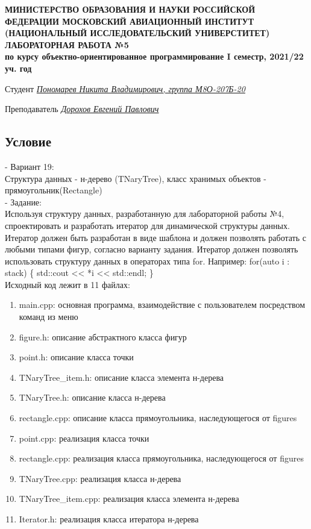 \documentclass[12pt]{article}
\begin{document}
\begin{titlepage}
\begin{center}
\textbf{МИНИСТЕРСТВО ОБРАЗОВАНИЯ И НАУКИ РОССИЙСКОЙ ФЕДЕРАЦИИ
\medskip
МОСКОВСКИЙ АВИАЦИОННЫЙ ИНСТИТУТ
(НАЦИОНАЛЬНЫЙ ИССЛЕДОВАТЕЛЬСКИЙ УНИВЕРСТИТЕТ)
\vfill\vfill
{\Huge ЛАБОРАТОРНАЯ РАБОТА №5} \\
по курсу объектно-ориентированное программирование
I семестр, 2021/22 уч. год}
\end{center}
\vfill

Студент \uline{\it {Пономарев Никита Владимирович, группа М8О-207Б-20}\hfill}

Преподаватель \uline{\it {Дорохов Евгений Павлович}\hfill}

\vfill
\end{titlepage}

\subsection*{Условие}
 - Вариант 19:\\
Структура данных - н-дерево (TNaryTree), класс хранимых объектов - прямоугольник(Rectangle)\\
 - Задание: \\
Используя структуру данных, разработанную для лабораторной работы №4, спроектировать и
разработать итератор для динамической структуры данных.
Итератор должен быть разработан в виде шаблона и должен позволять работать с любыми
типами фигур, согласно варианту задания.
Итератор должен позволять использовать структуру данных в операторах типа for. Например:\newline
for(auto i : stack) \{\newline
\hspace*{5mm}std::cout << *i << std::endl; \newline  
\}  \newline
\\

Исходный код лежит в 11 файлах:
\begin{enumerate}
\item main.cpp: основная программа, взаимодействие с пользователем посредством команд из меню
\item figure.h:    описание абстрактного класса фигур
\item point.h:     описание класса точки
\item TNaryTree\_item.h:  описание класса элемента н-дерева
\item TNaryTree.h: описание класса н-дерева
\item rectangle.cpp: описание класса прямоугольника, наследующегося от figures
\item point.cpp:     реализация класса точки
\item rectangle.cpp: реализация класса прямоугольника, наследующегося от figures
\item TNaryTree.cpp:  реализация класса н-дерева
\item TNaryTree\_item.cpp:  реализация класса элемента н-дерева
\item Iterator.h:  реализация класса итератора н-дерева

\end{enumerate}
\pagebreak
\end{document}
